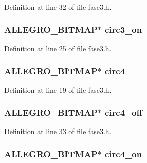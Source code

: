 Definition at line 32 of file fase3.\-h.

\hypertarget{struct_level_tres_ad58139cfabe6836662aec8a3293c9208}{
\subsubsection[{circ3\-\_\-on}]{\setlength{\rightskip}{0pt plus 5cm}A\-L\-L\-E\-G\-R\-O\-\_\-\-B\-I\-T\-M\-A\-P$\ast$ circ3\-\_\-on}}\label{struct_level_tres_ad58139cfabe6836662aec8a3293c9208}


Definition at line 25 of file fase3.\-h.

\hypertarget{struct_level_tres_a1adf43c25b4c9b87aeb45c1e4bd24d4f}{
\subsubsection[{circ4}]{\setlength{\rightskip}{0pt plus 5cm}A\-L\-L\-E\-G\-R\-O\-\_\-\-B\-I\-T\-M\-A\-P$\ast$ circ4}}\label{struct_level_tres_a1adf43c25b4c9b87aeb45c1e4bd24d4f}


Definition at line 19 of file fase3.\-h.

\hypertarget{struct_level_tres_a0d68273ce8ab1dd896de20c68c3e2de0}{
\subsubsection[{circ4\-\_\-off}]{\setlength{\rightskip}{0pt plus 5cm}A\-L\-L\-E\-G\-R\-O\-\_\-\-B\-I\-T\-M\-A\-P$\ast$ circ4\-\_\-off}}\label{struct_level_tres_a0d68273ce8ab1dd896de20c68c3e2de0}


Definition at line 33 of file fase3.\-h.

\hypertarget{struct_level_tres_ae514d3cf3c3cb83de5ab4682ead1c7f6}{
\subsubsection[{circ4\-\_\-on}]{\setlength{\rightskip}{0pt plus 5cm}A\-L\-L\-E\-G\-R\-O\-\_\-\-B\-I\-T\-M\-A\-P$\ast$ circ4\-\_\-on}}\label{struct_level_tres_ae514d3cf3c3cb83de5ab4682ead1c7f6}


